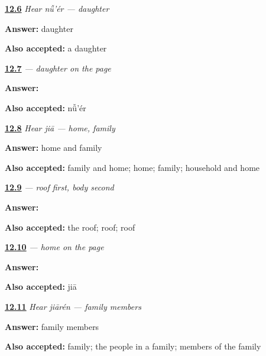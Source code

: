 \noindent\begin{minipage}[t]{\linewidth}
\raggedright
\hyperlink{review-ZH-C12-hear-nuer-meaning}{\textbf{12.6}} \emph{Hear \emph{nǚ'ér} — daughter}\par
\small \textbf{Answer:} daughter\par
\footnotesize \textbf{Also accepted:} a daughter
\end{minipage}\par\medskip

\noindent\begin{minipage}[t]{\linewidth}
\raggedright
\hyperlink{review-ZH-C12-nuer-write}{\textbf{12.7}} \emph{ — daughter on the page}\par
\small \textbf{Answer:} \par
\footnotesize \textbf{Also accepted:}  nǚ'ér
\end{minipage}\par\medskip

\noindent\begin{minipage}[t]{\linewidth}
\raggedright
\hyperlink{review-ZH-C12-hear-jia-meaning}{\textbf{12.8}} \emph{Hear \emph{jiā} — home, family}\par
\small \textbf{Answer:} home and family\par
\footnotesize \textbf{Also accepted:} family and home; home; family; household and home
\end{minipage}\par\medskip

\noindent\begin{minipage}[t]{\linewidth}
\raggedright
\hyperlink{review-ZH-W12-jia-build}{\textbf{12.9}} \emph{ — roof first, body second}\par
\small \textbf{Answer:} \par
\footnotesize \textbf{Also accepted:} the roof; roof;  roof
\end{minipage}\par\medskip

\noindent\begin{minipage}[t]{\linewidth}
\raggedright
\hyperlink{review-ZH-C12-jia-write}{\textbf{12.10}} \emph{ — home on the page}\par
\small \textbf{Answer:} \par
\footnotesize \textbf{Also accepted:}  jiā
\end{minipage}\par\medskip

\noindent\begin{minipage}[t]{\linewidth}
\raggedright
\hyperlink{review-ZH-C12-hear-jiaren-meaning}{\textbf{12.11}} \emph{Hear \emph{jiārén} — family members}\par
\small \textbf{Answer:} family members\par
\footnotesize \textbf{Also accepted:} family; the people in a family; members of the family
\end{minipage}\par\medskip

